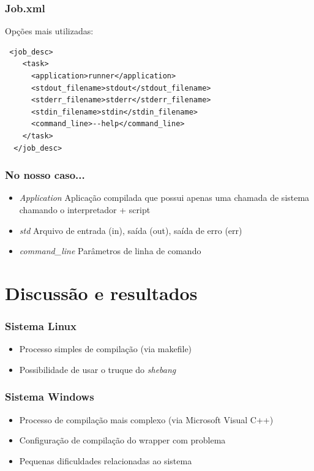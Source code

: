 \documentclass{beamer}
\begin{document}
\begin{frame}[fragile]
  \frametitle{Job.xml}
  Opções mais utilizadas:
 \begin{verbatim}
 <job_desc>
    <task>
      <application>runner</application>
      <stdout_filename>stdout</stdout_filename>
      <stderr_filename>stderr</stderr_filename>
      <stdin_filename>stdin</stdin_filename> 
      <command_line>--help</command_line>
    </task>
  </job_desc>
  \end{verbatim}
\end{frame}



\begin{frame}
  \frametitle{No nosso caso...}
  \begin{itemize}
    \item \emph{Application} Aplicação compilada que possui apenas uma chamada de sistema chamando o interpretador + script
    \item \emph{std\*} Arquivo de entrada (in), saída (out), saída de erro (err)
    \item \emph{command\_line} Parâmetros de linha de comando
  \end{itemize}
\end{frame}

\section{Discussão e resultados} 

\begin{frame}
  \frametitle{Sistema Linux}
  \begin{itemize}
    \item Processo simples de compilação (via makefile)
    \item Possibilidade de usar o truque do \textit{shebang}
  \end{itemize}
\end{frame}

\begin{frame}
  \frametitle{Sistema Windows}
  \begin{itemize}
    \item Processo de compilação mais complexo (via Microsoft Visual C++)
    \item Configuração de compilação do wrapper com problema
    \item Pequenas dificuldades relacionadas ao sistema
  \end{itemize}
\end{frame}
\end{document}
